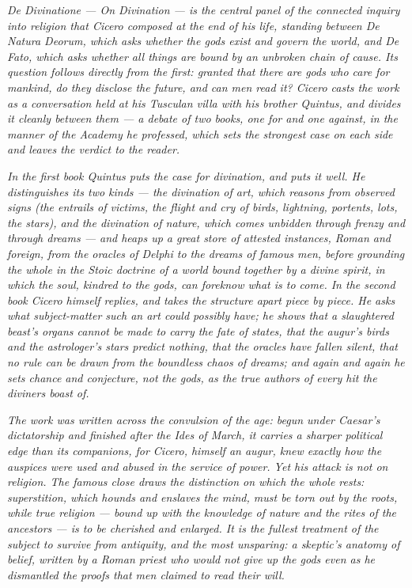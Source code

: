 
\textit{\textit{De Divinatione} --- On Divination --- is the central panel
of the connected inquiry into religion that Cicero composed at the end of
his life, standing between \textit{De Natura Deorum}, which asks whether
the gods exist and govern the world, and \textit{De Fato}, which asks
whether all things are bound by an unbroken chain of cause. Its question
follows directly from the first: granted that there are gods who care for
mankind, do they disclose the future, and can men read it? Cicero casts
the work as a conversation held at his Tusculan villa with his brother
Quintus, and divides it cleanly between them --- a debate of two books,
one for and one against, in the manner of the Academy he professed, which
sets the strongest case on each side and leaves the verdict to the
reader.}

\textit{In the first book Quintus puts the case for divination, and puts
it well. He distinguishes its two kinds --- the divination of art, which
reasons from observed signs (the entrails of victims, the flight and cry
of birds, lightning, portents, lots, the stars), and the divination of
nature, which comes unbidden through frenzy and through dreams --- and
heaps up a great store of attested instances, Roman and foreign, from the
oracles of Delphi to the dreams of famous men, before grounding the whole
in the Stoic doctrine of a world bound together by a divine spirit, in
which the soul, kindred to the gods, can foreknow what is to come. In the
second book Cicero himself replies, and takes the structure apart piece by
piece. He asks what subject-matter such an art could possibly have; he
shows that a slaughtered beast's organs cannot be made to carry the fate
of states, that the augur's birds and the astrologer's stars predict
nothing, that the oracles have fallen silent, that no rule can be drawn
from the boundless chaos of dreams; and again and again he sets chance and
conjecture, not the gods, as the true authors of every hit the diviners
boast of.}

\textit{The work was written across the convulsion of the age: begun
under Caesar's dictatorship and finished after the Ides of March, it
carries a sharper political edge than its companions, for Cicero, himself
an augur, knew exactly how the auspices were used and abused in the
service of power. Yet his attack is not on religion. The famous close
draws the distinction on which the whole rests: superstition, which
hounds and enslaves the mind, must be torn out by the roots, while true
religion --- bound up with the knowledge of nature and the rites of the
ancestors --- is to be cherished and enlarged. It is the fullest
treatment of the subject to survive from antiquity, and the most
unsparing: a skeptic's anatomy of belief, written by a Roman priest who
would not give up the gods even as he dismantled the proofs that men
claimed to read their will.}
